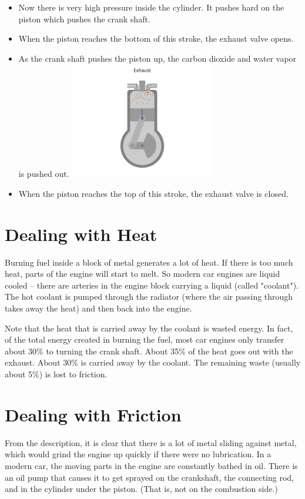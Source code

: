\begin{itemize}
\item Now there is very high pressure inside the cylinder.  It pushes hard on the piston which pushes  the crank shaft.
\item When the piston reaches the bottom of this stroke,  the exhaust valve opens.
\item As the crank shaft pushes the piston up,  the carbon dioxide and water vapor is pushed out.
\includegraphics[width=0.5\textwidth]{engine-12.png}

\item When the piston reaches the top of this stroke,  the exhaust valve is closed.
\end{itemize}

\section{Dealing with Heat}

Burning fuel inside a block of metal generates a lot of heat.  If there is too much heat,  parts of the engine will start to melt.  So modern car engines are liquid cooled -- there are arteries in the engine block carrying a liquid (called "coolant").  The hot coolant is pumped through the radiator (where the air passing through takes away the heat) and then back into the engine.

Note that the heat that is carried away by the coolant is wasted energy.    In fact,  of the total energy created in burning the fuel,  most car engines only transfer about 30\% to turning the crank shaft.  About 35\% of the heat goes out with the exhaust.  About 30\% is carried away by the coolant.  
The remaining waste (usually about  5\%) is lost to friction.

\section{Dealing with Friction}

From the description,  it is clear that there is a lot of metal sliding against metal,  which would grind the engine up quickly if there were no lubrication.  In a modern car, the moving parts in the engine are constantly bathed in oil.  There is an oil pump that causes it to get sprayed on the crankshaft, the connecting rod, and in the cylinder under the piston. (That is, not on the combustion side.)  

